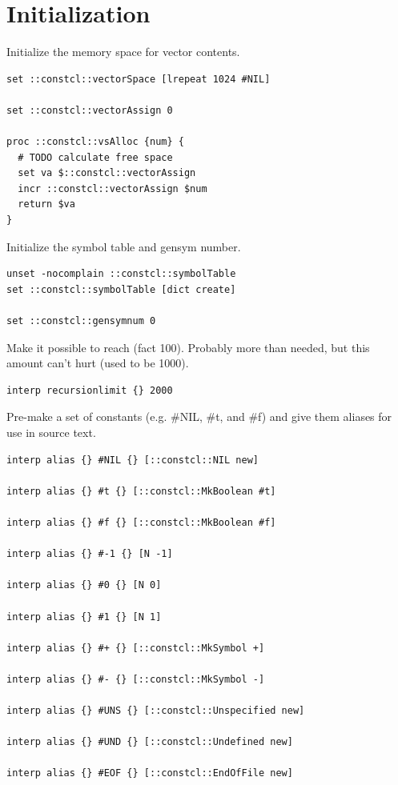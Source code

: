 \documentclass[twoside,9pt]{report}
\begin{document}
\chapter{Initialization}
\label{initialization}


Initialize the memory space for vector contents.

\begin{lstlisting}
set ::constcl::vectorSpace [lrepeat 1024 #NIL]

set ::constcl::vectorAssign 0

proc ::constcl::vsAlloc {num} {
  # TODO calculate free space
  set va $::constcl::vectorAssign
  incr ::constcl::vectorAssign $num
  return $va
}
\end{lstlisting}


Initialize the symbol table and gensym number.

\begin{lstlisting}
unset -nocomplain ::constcl::symbolTable
set ::constcl::symbolTable [dict create]

set ::constcl::gensymnum 0
\end{lstlisting}


Make it possible to reach (fact 100). Probably more than needed, but this amount can't hurt (used to be 1000).

\begin{lstlisting}
interp recursionlimit {} 2000
\end{lstlisting}


Pre-make a set of constants (e.g. \#NIL, \#t, and \#f) and give them aliases for use in source text.

\begin{lstlisting}
interp alias {} #NIL {} [::constcl::NIL new]

interp alias {} #t {} [::constcl::MkBoolean #t]

interp alias {} #f {} [::constcl::MkBoolean #f]

interp alias {} #-1 {} [N -1]

interp alias {} #0 {} [N 0]

interp alias {} #1 {} [N 1]

interp alias {} #+ {} [::constcl::MkSymbol +]

interp alias {} #- {} [::constcl::MkSymbol -]

interp alias {} #UNS {} [::constcl::Unspecified new]

interp alias {} #UND {} [::constcl::Undefined new]

interp alias {} #EOF {} [::constcl::EndOfFile new]
\end{lstlisting}
\end{document}
